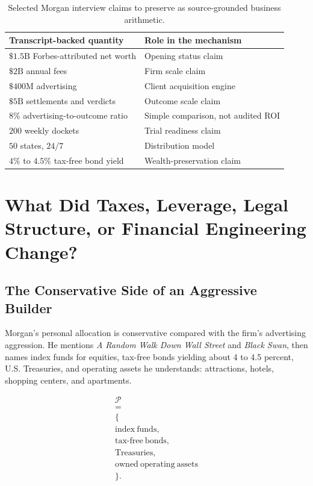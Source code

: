 \documentclass[11pt,oneside]{book}
\begin{document}
\begin{table}
\centering
\begin{tabular}{|p{.43\linewidth}|p{.43\linewidth}|}
\hline
Transcript-backed quantity & Role in the mechanism\\
\hline
\(\$1.5\mathrm{B}\) Forbes-attributed net worth & Opening status claim\\
\hline
\(\$2\mathrm{B}\) annual fees & Firm scale claim\\
\hline
\(\$400\mathrm{M}\) advertising & Client acquisition engine\\
\hline
\(\$5\mathrm{B}\) settlements and verdicts & Outcome scale claim\\
\hline
\(8\%\) advertising-to-outcome ratio & Simple comparison, not audited ROI\\
\hline
\(200\) weekly dockets & Trial readiness claim\\
\hline
\(50\) states, \(24/7\) & Distribution model\\
\hline
\(4\%\) to \(4.5\%\) tax-free bond yield & Wealth-preservation claim\\
\hline
\end{tabular}
\caption{Selected Morgan interview claims to preserve as source-grounded business arithmetic.}
\end{table}

\chapter{What Did Taxes, Leverage, Legal Structure, or Financial Engineering Change?}

\section{The Conservative Side of an Aggressive Builder}

Morgan's personal allocation is conservative compared with the firm's advertising aggression. He mentions \emph{A Random Walk Down Wall Street} and \emph{Black Swan}, then names index funds for equities, tax-free bonds yielding about 4 to 4.5 percent, U.S. Treasuries, and operating assets he understands: attractions, hotels, shopping centers, and apartments.

\begin{equation}
\begin{gathered}
\mathcal{P}\\
=\\
\{\\
\mathrm{index\ funds},\\
\mathrm{tax\mbox{-}free\ bonds},\\
\mathrm{Treasuries},\\
\mathrm{owned\ operating\ assets}\\
\}.
\end{gathered}
\end{equation}
\end{document}
